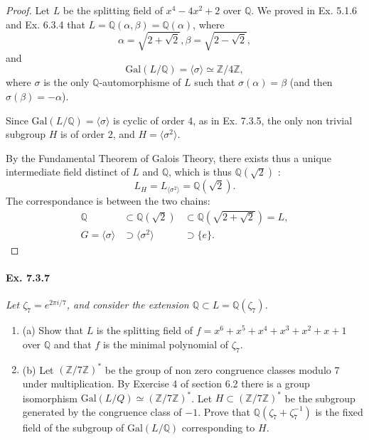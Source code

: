 \documentclass[11pt,a4paper]{article}
\newcommand{\be} {\begin{enumerate}}
\newcommand{\ee} {\end{enumerate}}
\newcommand{\Q}{\mathbb{Q}}
\newcommand{\Z}{\mathbb{Z}}
\newcommand{\Gal}{\mathrm{Gal}}
\begin{document}
\begin{proof}
Let $L$ be the splitting field of  $x^4 - 4x^2 + 2$ over $\Q$.
We proved in Ex. 5.1.6 and Ex. 6.3.4 that $L = \Q(\alpha, \beta) = \Q(\alpha)$, where
$$\alpha = \sqrt{2 + \sqrt{2}}, \beta = \sqrt{2 - \sqrt{2}},$$
and
$$\Gal(L/\Q) = \langle \sigma \rangle \simeq \Z/4\Z,$$
where $\sigma$ is the only $\Q$-automorphisme of $L$ such that $\sigma(\alpha) = \beta$ (and then $\sigma(\beta) = -\alpha$).

Since $\Gal(L/\Q) = \langle \sigma \rangle$ is cyclic of order 4, as in Ex. 7.3.5, the only non trivial subgroup $H$ is of order 2, and $H = \langle \sigma^2\rangle$.

By the Fundamental Theorem of Galois Theory, there exists thus a unique intermediate field distinct of $L$ and $\Q$, which is thus $\Q(\sqrt{2})$ :
$$L_H = L_{\langle \sigma^2 \rangle} = \Q(\sqrt{2}).$$
The correspondance is between the two chains:
$$
\begin{array}{lll}
\Q &\subset \Q(\sqrt{2}) &\subset \Q(\sqrt{2+ \sqrt{2}}) = L,\\
G = \langle\sigma\rangle &\supset \langle \sigma^2 \rangle &\supset \{e\}.
\end{array}
$$

\end{proof}

\paragraph{Ex. 7.3.7}

{\it Let $\zeta_7 = e^{2\pi i/7}$, and consider the extension $\Q \subset L = \Q(\zeta_7)$.
\be
\item[(a)] Show that $L$ is the splitting field of $f = x^6 +x^5 +x^4+x^3+x^2+x+1$ over $\Q$ and that $f$ is the minimal polynomial of $\zeta_7$.
\item[(b)] Let $(\Z/7\Z)^*$ be the group of non zero congruence classes modulo 7 under multiplication. By Exercise 4 of section 6.2 there is a group isomorphism $\Gal(L/Q) \simeq (\Z/7\Z)^*$. Let $H \subset (\Z/7\Z)^*$ be the subgroup generated by the congruence class of $-1$. Prove that $\Q(\zeta_7 + \zeta_7^{-1})$ is the fixed field of the subgroup of $\Gal(L/\Q)$ corresponding to $H$.
\ee
}
\end{document}
